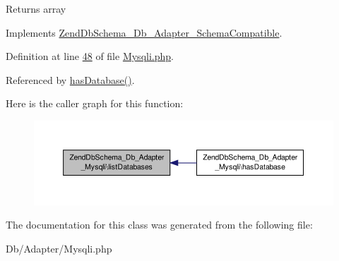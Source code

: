 \begin{DoxyReturn}{Returns}
array 
\end{DoxyReturn}


Implements \hyperlink{interfaceZendDbSchema__Db__Adapter__SchemaCompatible_a4c7951a6b329d2106502dbbaae82e51d}{Zend\-Db\-Schema\-\_\-\-Db\-\_\-\-Adapter\-\_\-\-Schema\-Compatible}.



Definition at line \hyperlink{Mysqli_8php_source_l00048}{48} of file \hyperlink{Mysqli_8php_source}{Mysqli.\-php}.



Referenced by \hyperlink{Mysqli_8php_source_l00038}{has\-Database()}.



Here is the caller graph for this function\-:\nopagebreak
\begin{figure}[H]
\begin{center}
\leavevmode
\includegraphics[width=350pt]{classZendDbSchema__Db__Adapter__Mysqli_abc74258342f5cd4b637feb4561b6ab37_icgraph}
\end{center}
\end{figure}




The documentation for this class was generated from the following file\-:\begin{DoxyCompactItemize}
\item 
Db/\-Adapter/Mysqli.\-php\end{DoxyCompactItemize}
